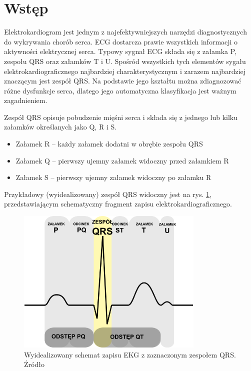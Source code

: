 \section{Wstęp}

\qquad Elektrokardiogram jest jednym z najefektywniejszych narzędzi diagnostycznych do wykrywania chorób serca. ECG dostarcza prawie wszystkich informacji o aktywności elektrycznej serca. Typowy sygnał ECG składa się z załamka P, zespołu QRS oraz załamków T i U. Spośród wszystkich tych elementów sygału elektrokardiograficznego najbardziej charakterystycznym i zarazem najbardziej znaczącym jest zespół QRS. Na podstawie jego kształtu można zdiagnozować różne dysfunkcje serca, dlatego jego automatyczna klasyfikacja jest ważnym zagadnieniem.

\qquad Zespół QRS opisuje pobudzenie mięśni serca i składa się z jednego lub kilku załamków określanych jako Q, R i S.
\begin{itemize}
	\item Załamek R – każdy załamek dodatni w obrębie zespołu QRS
	\item Załamek Q – pierwszy ujemny załamek widoczny przed załamkiem R
	\item Załamek S – pierwszy ujemny załamek widoczny po załamku R
\end{itemize}

Przykładowy (wyidealizowany) zespół QRS widoczny jest na rys. \ref{fig:QRSComplex}, przedstawiającym schematyczny fragment zapisu elektrokardiograficznego.


\begin{figure}[h]
	\centering
	\includegraphics[width=0.8\textwidth]{Grafika/ZespolQRS}
	\caption{Wyidealizowany schemat zapisu EKG z zaznaczonym zespołem QRS. Źródło  \cite{QRSComplexWiki}}
	\label{fig:QRSComplex}
\end{figure}


